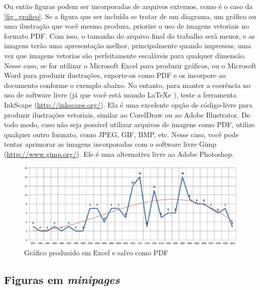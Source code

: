 Ou então figuras podem ser incorporadas de arquivos externos, como é o caso da
\autoref{fig_grafico}. Se a figura que ser incluída se tratar de um diagrama, um
gráfico ou uma ilustração que você mesmo produza, priorize o uso de imagens
vetoriais no formato PDF. Com isso, o tamanho do arquivo final do trabalho será
menor, e as imagens terão uma apresentação melhor, principalmente quando
impressas, uma vez que imagens vetorias são perfeitamente escaláveis para
qualquer dimensão. Nesse caso, se for utilizar o Microsoft Excel para produzir
gráficos, ou o Microsoft Word para produzir ilustrações, exporte-os como PDF e
os incorpore ao documento conforme o exemplo abaixo. No entanto, para manter a
coerência no uso de software livre (já que você está usando \LaTeX e \abnTeX),
teste a ferramenta \textsf{InkScape}
(\url{http://inkscape.org/}). Ela é uma excelente opção de código-livre para
produzir ilustrações vetoriais, similar ao CorelDraw ou ao Adobe
Illustrator. De todo modo, caso não seja possível
utilizar arquivos de imagens como PDF, utilize qualquer outro formato, como
JPEG, GIF, BMP, etc. Nesse caso, você pode tentar aprimorar as imagens
incorporadas com o software livre \textsf{Gimp}
(\url{http://www.gimp.org/}). Ele é uma alternativa livre ao Adobe
Photoshop.

\begin{figure}[htb]
	\caption{\label{fig_grafico}Gráfico produzido em Excel e salvo como PDF}
	\begin{center}
	    \includegraphics[scale=0.5]{imagens/abntex2-modelo-img-grafico.pdf}
	\end{center}
\end{figure}

\subsection{Figuras em \emph{minipages}}

